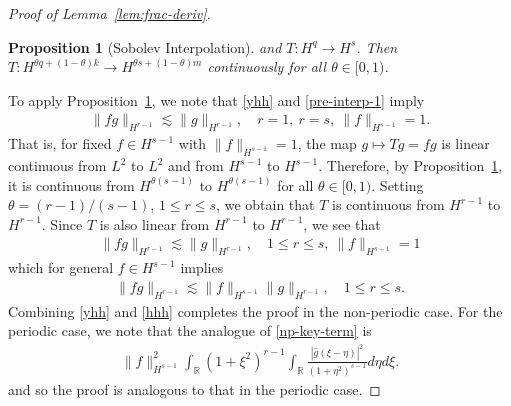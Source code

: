 \documentclass[12pt,reqno]{amsart}
\numberwithin{equation}{section}  %
\numberwithin{figure}{section}
\newcommand{\rr}{\mathbb{R}}
\newcommand{\wh}{\widehat}
\newtheorem{proposition}[theorem]{Proposition}
\newtheorem{definition}[theorem]{Definition}
\begin{document}
\begin{proof}[Proof of Lemma~\ref{lem:frac-deriv}]
\begin{proposition}[Sobolev Interpolation]
and $T: H^{q} \to H^{s}$. Then\\ $T: H^{\theta q + (1 - \theta)k} \to H^{\theta
s + (1 - \theta) m}$ continuously for all $\theta \in [0,1)$.
\label{prop:sob-interp}
\end{proposition}
%
To apply Proposition~\ref{prop:sob-interp}, we note that \eqref{yhh}
and \eqref{pre-interp-1} imply
%
%
\begin{equation*}
\begin{split}
  \| f g \|_{H^{r-1}} \lesssim \| g \|_{H^{r-1}}, \quad
  r=1, \  r =s, \ \| f \|_{H^{s-1}} =1.
\end{split}
\end{equation*}
%
%
That is, for fixed $f \in H^{s-1}$ with $\| f \|_{H^{s-1}} =1$, the map $g \mapsto
Tg = fg$ is linear continuous from $L^{2}$ to $L^{2}$ and from $H^{s-1}$ to
$H^{s-1}$. Therefore, by Proposition~\ref{prop:sob-interp}, it is continuous from
$H^{\theta (s-1) }$ to $H^{\theta (s-1)}$ for all $\theta \in
[0, 1)$. Setting $\theta = (r-1)/(s-1)$, $ 1 \le r \le s$, we obtain that $T$ is
continuous from $H^{r-1}$ to $H^{r-1}$. Since $T$ is also linear from $H^{r-1}$
to $H^{r-1}$, we see that 
%
%
\begin{equation*}
\begin{split}
  \| f g \|_{H^{r-1}} \lesssim \| g \|_{H^{r-1}}, \quad 1 \le r \le s, \
  \| f \|_{H^{s-1}} =1
\end{split}
\end{equation*}
which for general $f \in H^{s-1}$ implies 
%
\begin{equation}
  \label{hhh}
\begin{split}
  \| f g \|_{H^{r-1}} \lesssim \|f \|_{H^{s-1}}
  \| g \|_{H^{r-1}}, \quad 1 \le r \le s. 
\end{split}
\end{equation}
%
Combining \eqref{yhh} and \eqref{hhh} completes the proof in the non-periodic
case. For the periodic case, we note that the analogue of \eqref{np-key-term} is
%
%
%
\begin{equation*}
\begin{split}
   \| f \|_{H^{s-1}}^{2}  \int_{\rr}   (1 + \xi^{2})^{r-1} \int_{\rr} \frac{|
       \wh{g}(\xi - \eta)
  |^{2}}{(1 + \eta^{2})^{s-1}} d \eta d \xi.
\end{split}
\end{equation*}
%
%
and so the proof is analogous to that in the periodic case.
\end{proof}
%
\end{document}
